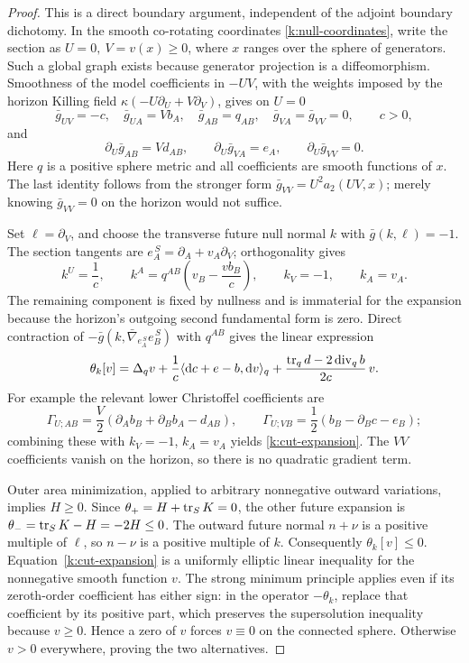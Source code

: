 \begin{proof}
This is a direct boundary argument, independent of the adjoint
boundary dichotomy. In the smooth co-rotating coordinates
\eqref{k:null-coordinates}, write the section as
\(U=0,\ V=v(x)\ge0\), where \(x\) ranges over the sphere of
generators. Such a global graph exists because generator
projection is a diffeomorphism.
Smoothness of the model coefficients in \(-UV\), with the
weights imposed by the horizon Killing field
\(\kappa(-U\partial_U+V\partial_V)\), gives on \(U=0\)
\[
 \bar g_{UV}=-c,\quad
 \bar g_{UA}=Vb_A,\quad
 \bar g_{AB}=q_{AB},\quad
 \bar g_{VA}=\bar g_{VV}=0,\qquad c>0,
\]
and
\[
 \partial_U\bar g_{AB}=Vd_{AB},\qquad
 \partial_U\bar g_{VA}=e_A,\qquad
 \partial_U\bar g_{VV}=0.
\]
Here \(q\) is a positive sphere metric and all coefficients
are smooth functions of \(x\). The last identity follows from
the stronger form \(\bar g_{VV}=U^2a_2(UV,x)\); merely knowing
\(\bar g_{VV}=0\) on the horizon would not suffice.

Set \(\ell=\partial_V\), and choose the transverse future null
normal \(k\) with \(\bar g(k,\ell)=-1\). The section tangents
are \(e_A^{\,S}=\partial_A+v_A\partial_V\); orthogonality gives
\[
 k^U=\frac1c,\qquad
 k^A=q^{AB}\left(v_B-\frac{v b_B}{c}\right),\qquad
 k_V=-1,\qquad k_A=v_A.
\]
The remaining component is fixed by nullness and is immaterial
for the expansion because the horizon's outgoing second
fundamental form is zero. Direct contraction of
\(-\bar g(k,\bar\nabla_{e_A^{\,S}}e_B^{\,S})\) with \(q^{AB}\)
gives the linear expression
\begin{equation}\label{k:cut-expansion}
 \theta_k[v]=
 \Delta_q v+
 \frac1c\langle\mathrm d c+e-b,\mathrm d v\rangle_q+
 \frac{\operatorname{tr}_qd-2\operatorname{div}_q b}{2c}\,v .
\end{equation}
For example the relevant lower Christoffel coefficients are
\[
 \Gamma_{U;AB}
    =\frac V2(\partial_A b_B+\partial_B b_A-d_{AB}),\qquad
 \Gamma_{U;VB}
    =\frac12(b_B-\partial_Bc-e_B);
\]
combining these with \(k_V=-1\), \(k_A=v_A\) yields
\eqref{k:cut-expansion}. The \(VV\) coefficients vanish on
the horizon, so there is no quadratic gradient term.

Outer area minimization, applied to arbitrary nonnegative
outward variations, implies \(H\ge0\). Since
\(\theta_+=H+\operatorname{tr}_SK=0\), the other future expansion is
\(\theta_-=\operatorname{tr}_SK-H=-2H\le0\).
The outward future normal \(n+\nu\) is a positive multiple
of \(\ell\), so \(n-\nu\) is a positive multiple of \(k\).
Consequently \(\theta_k[v]\le0\).
Equation~\eqref{k:cut-expansion} is a uniformly elliptic
linear inequality for the nonnegative smooth function \(v\).
The strong minimum principle applies even if its zeroth-order
coefficient has either sign: in the operator
\(-\theta_k\), replace that coefficient by its positive part,
which preserves the supersolution inequality because
\(v\ge0\). Hence a zero of \(v\) forces \(v\equiv0\) on the
connected sphere. Otherwise \(v>0\) everywhere, proving the
two alternatives.
\end{proof}

